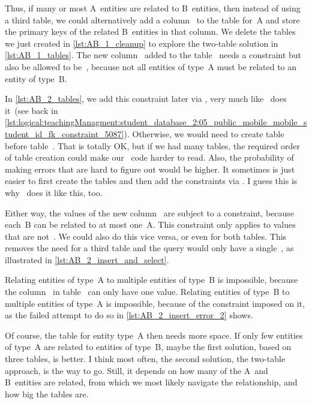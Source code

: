 Thus, if many or most A~entities are related to B~entities, then instead of using a third table, we could alternatively add a column~ to the table for~A and store the primary keys of the related B~entities in that column.
We delete the tables we just created in \cref{lst:AB_1_cleanup} to explore the two-table solution in \cref{lst:AB_1_tables}.
The new column~ added to the table~ needs a  constraint but also be allowed to be~, because not all entities of type~A must be related to an entity of type~B.

In \cref{lst:AB_2_tables}, we add this constraint later via , very much like \pgmodeler\ does it~(see back in \cref{lst:logical:teachingManagment:student_database_2:05_public_mobile_mobile_student_id_fk_constraint_5087}).
Otherwise, we would need to create table~ before table~.
That is totally OK, but if we had many tables, the required order of table creation could make our \sql\ code harder to read.
Also, the probability of making errors that are hard to figure out would be higher.
It sometimes is just easier to first create the tables and then add the constraints via .
I guess this is why \pgmodeler\ does it like this, too.

Either way, the values of the new column~ are subject to a  constraint, because each~B can be related to at most one~A.
This constraint only applies to values that are not~.
We could also do this vice versa, or even for both tables.
This removes the need for a third table and the query would only have a single~, as illustrated in \cref{lst:AB_2_insert_and_select}.

Relating entities of type~A to multiple entities of type~B is impossible, because the column~ in table~ can only have one value.
Relating entities of type~B to multiple entities of type~A is impossible, because of the  constraint imposed on it, as the failed attempt to do so in \cref{lst:AB_2_insert_error_2} shows.

Of course, the table for entity type~A then needs more space.
If only few entities of type~A are related to entities of type~B, maybe the first solution, based on three tables, is better.
I think most often, the second solution, the two-table approach, is the way to go.
Still, it depends on how many of the A~and B~entities are related, from which  we most likely navigate the relationship, and how big the tables are.%
%
\FloatBarrier%
\endhsection%
